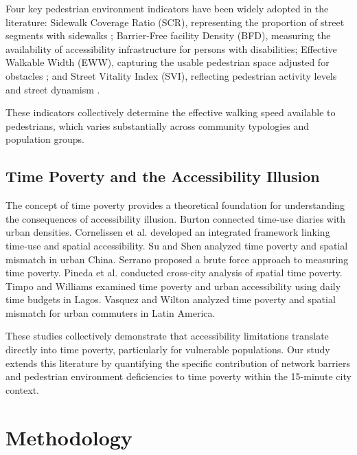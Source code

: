 \documentclass[10pt,conference,compsoc]{IEEEtran}
\begin{document}
Four key pedestrian environment indicators have been widely adopted in the literature: Sidewalk Coverage Ratio (SCR), representing the proportion of street segments with sidewalks \cite{xu2021residential}; Barrier-Free facility Density (BFD), measuring the availability of accessibility infrastructure for persons with disabilities; Effective Walkable Width (EWW), capturing the usable pedestrian space adjusted for obstacles \cite{zhu2021pedestrian}; and Street Vitality Index (SVI), reflecting pedestrian activity levels and street dynamism \cite{long2020deep}.

These indicators collectively determine the effective walking speed available to pedestrians, which varies substantially across community typologies and population groups.

\subsection{Time Poverty and the Accessibility Illusion}

The concept of time poverty \cite{vickery1977time} provides a theoretical foundation for understanding the consequences of accessibility illusion. Burton \cite{burton2000time} connected time-use diaries with urban densities. Cornelissen et al. \cite{cornelissen2018connecting} developed an integrated framework linking time-use and spatial accessibility. Su and Shen \cite{su2019time} analyzed time poverty and spatial mismatch in urban China. Serrano \cite{serrano2014brute} proposed a brute force approach to measuring time poverty. Pineda et al. \cite{pineda2020time} conducted cross-city analysis of spatial time poverty. Timpo and Williams \cite{timpo2021time} examined time poverty and urban accessibility using daily time budgets in Lagos. Vasquez and Wilton \cite{vasquez2021time} analyzed time poverty and spatial mismatch for urban commuters in Latin America.

These studies collectively demonstrate that accessibility limitations translate directly into time poverty, particularly for vulnerable populations. Our study extends this literature by quantifying the specific contribution of network barriers and pedestrian environment deficiencies to time poverty within the 15-minute city context.

\section{Methodology}
\label{sec:methodology}
\end{document}
